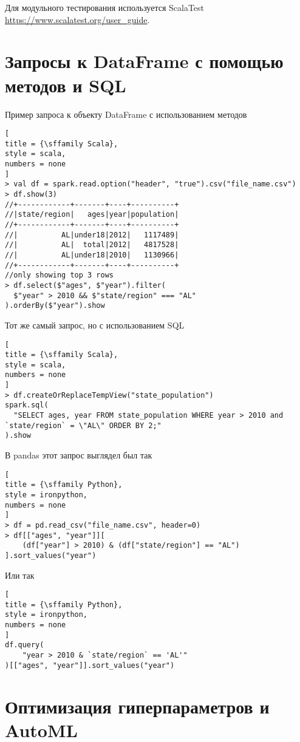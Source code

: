\documentclass[%
	11pt,
	a4paper,
	utf8,
		]{article}
\begin{document}
Для модульного тестирования используется ScalaTest \url{https://www.scalatest.org/user_guide}.


\section{Запросы к DataFrame с помощью методов и SQL}

Пример запроса к объекту DataFrame с использованием методов
\begin{lstlisting}[
title = {\sffamily Scala},
style = scala,
numbers = none	
]
> val df = spark.read.option("header", "true").csv("file_name.csv")
> df.show(3)
//+------------+-------+----+----------+
//|state/region|   ages|year|population|
//+------------+-------+----+----------+
//|          AL|under18|2012|   1117489|
//|          AL|  total|2012|   4817528|
//|          AL|under18|2010|   1130966|
//+------------+-------+----+----------+
//only showing top 3 rows
> df.select($"ages", $"year").filter(
  $"year" > 2010 && $"state/region" === "AL"
).orderBy($"year").show
\end{lstlisting}

Тот же самый запрос, но с использованием SQL
\begin{lstlisting}[
title = {\sffamily Scala},
style = scala,
numbers = none	
]
> df.createOrReplaceTempView("state_population")
spark.sql(
  "SELECT ages, year FROM state_population WHERE year > 2010 and `state/region` = \"AL\" ORDER BY 2;"
).show
\end{lstlisting}

В pandas этот запрос выглядел был так

\begin{lstlisting}[
title = {\sffamily Python},
style = ironpython,
numbers = none	
]
> df = pd.read_csv("file_name.csv", header=0)
> df[["ages", "year"]][
    (df["year"] > 2010) & (df["state/region"] == "AL")
].sort_values("year")
\end{lstlisting}

Или так
\begin{lstlisting}[
title = {\sffamily Python},
style = ironpython,
numbers = none	
]
df.query(
    "year > 2010 & `state/region` == 'AL'"
)[["ages", "year"]].sort_values("year")
\end{lstlisting}




\section{Оптимизация гиперпараметров и AutoML}
\end{document}
